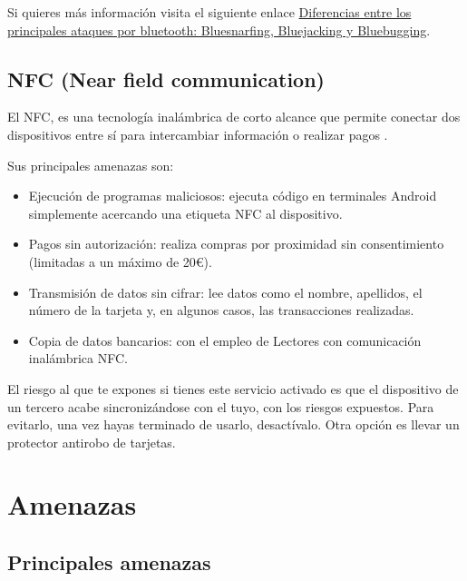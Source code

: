 \documentclass[
  a4paper,
  openany]{book}
\begin{document}
Si quieres más información visita el siguiente enlace \href{https://computerhoy.com/noticias/tecnologia/diferencias-principales-ataques-bluetooth-bluesnarfing-bluejacking-bluebugging-1087867}{Diferencias entre los principales ataques por bluetooth: Bluesnarfing, Bluejacking y Bluebugging}.

\hypertarget{nfc-near-field-communication}{%
\section{NFC (Near field communication)}\label{nfc-near-field-communication}}

El NFC, es una tecnología inalámbrica de corto alcance que permite conectar dos dispositivos entre sí para intercambiar información o realizar pagos \citep{IONOS-nfc}.

Sus principales amenazas son:

\begin{itemize}
\item
  Ejecución de programas maliciosos: ejecuta código en terminales Android simplemente acercando una etiqueta NFC al dispositivo.
\item
  Pagos sin autorización: realiza compras por proximidad sin consentimiento (limitadas a un máximo de 20€).
\item
  Transmisión de datos sin cifrar: lee datos como el nombre, apellidos, el número de la tarjeta y, en algunos casos, las transacciones realizadas.
\item
  Copia de datos bancarios: con el empleo de Lectores con comunicación inalámbrica NFC.
\end{itemize}

El riesgo al que te expones si tienes este servicio activado es que el dispositivo de un tercero acabe sincronizándose con el tuyo, con los riesgos expuestos. Para evitarlo, una vez hayas terminado de usarlo, desactívalo. Otra opción es llevar un protector antirobo de tarjetas.

\hypertarget{amenazas}{%
\chapter{Amenazas}\label{amenazas}}

\hypertarget{principales-amenazas}{%
\section{Principales amenazas}\label{principales-amenazas}}
\end{document}
